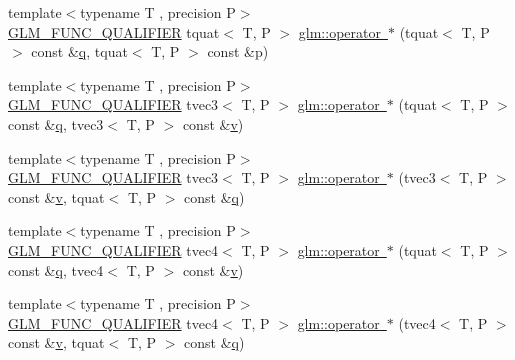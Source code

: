 \begin{DoxyCompactItemize}
\item 
{\footnotesize template$<$typename T , precision P$>$ }\\\mbox{\hyperlink{setup_8hpp_a33fdea6f91c5f834105f7415e2a64407}{G\+L\+M\+\_\+\+F\+U\+N\+C\+\_\+\+Q\+U\+A\+L\+I\+F\+I\+ER}} tquat$<$ T, P $>$ \mbox{\hyperlink{group__gtc__quaternion_ga34388abcfaea2b9328538c35fad4cceb}{glm\+::operator $\ast$}} (tquat$<$ T, P $>$ const \&\mbox{\hyperlink{glad_8h_a514729309336df22bcc8eda979d6ced4}{q}}, tquat$<$ T, P $>$ const \&p)
\item 
{\footnotesize template$<$typename T , precision P$>$ }\\\mbox{\hyperlink{setup_8hpp_a33fdea6f91c5f834105f7415e2a64407}{G\+L\+M\+\_\+\+F\+U\+N\+C\+\_\+\+Q\+U\+A\+L\+I\+F\+I\+ER}} tvec3$<$ T, P $>$ \mbox{\hyperlink{group__gtc__quaternion_ga9899f835a115424e711bfd1e793a9df7}{glm\+::operator $\ast$}} (tquat$<$ T, P $>$ const \&\mbox{\hyperlink{glad_8h_a514729309336df22bcc8eda979d6ced4}{q}}, tvec3$<$ T, P $>$ const \&\mbox{\hyperlink{glad_8h_a14cfbe2fc2234f5504618905b69d1e06}{v}})
\item 
{\footnotesize template$<$typename T , precision P$>$ }\\\mbox{\hyperlink{setup_8hpp_a33fdea6f91c5f834105f7415e2a64407}{G\+L\+M\+\_\+\+F\+U\+N\+C\+\_\+\+Q\+U\+A\+L\+I\+F\+I\+ER}} tvec3$<$ T, P $>$ \mbox{\hyperlink{group__gtc__quaternion_gaf630705b358b32f057587467fd0cca49}{glm\+::operator $\ast$}} (tvec3$<$ T, P $>$ const \&\mbox{\hyperlink{glad_8h_a14cfbe2fc2234f5504618905b69d1e06}{v}}, tquat$<$ T, P $>$ const \&\mbox{\hyperlink{glad_8h_a514729309336df22bcc8eda979d6ced4}{q}})
\item 
{\footnotesize template$<$typename T , precision P$>$ }\\\mbox{\hyperlink{setup_8hpp_a33fdea6f91c5f834105f7415e2a64407}{G\+L\+M\+\_\+\+F\+U\+N\+C\+\_\+\+Q\+U\+A\+L\+I\+F\+I\+ER}} tvec4$<$ T, P $>$ \mbox{\hyperlink{group__gtc__quaternion_gab63797896ca2db7fd5afa10ee01cf60f}{glm\+::operator $\ast$}} (tquat$<$ T, P $>$ const \&\mbox{\hyperlink{glad_8h_a514729309336df22bcc8eda979d6ced4}{q}}, tvec4$<$ T, P $>$ const \&\mbox{\hyperlink{glad_8h_a14cfbe2fc2234f5504618905b69d1e06}{v}})
\item 
{\footnotesize template$<$typename T , precision P$>$ }\\\mbox{\hyperlink{setup_8hpp_a33fdea6f91c5f834105f7415e2a64407}{G\+L\+M\+\_\+\+F\+U\+N\+C\+\_\+\+Q\+U\+A\+L\+I\+F\+I\+ER}} tvec4$<$ T, P $>$ \mbox{\hyperlink{group__gtc__quaternion_gaac2743bed4951a088d72e41e0c72a2cc}{glm\+::operator $\ast$}} (tvec4$<$ T, P $>$ const \&\mbox{\hyperlink{glad_8h_a14cfbe2fc2234f5504618905b69d1e06}{v}}, tquat$<$ T, P $>$ const \&\mbox{\hyperlink{glad_8h_a514729309336df22bcc8eda979d6ced4}{q}})

\end{DoxyCompactItemize}
